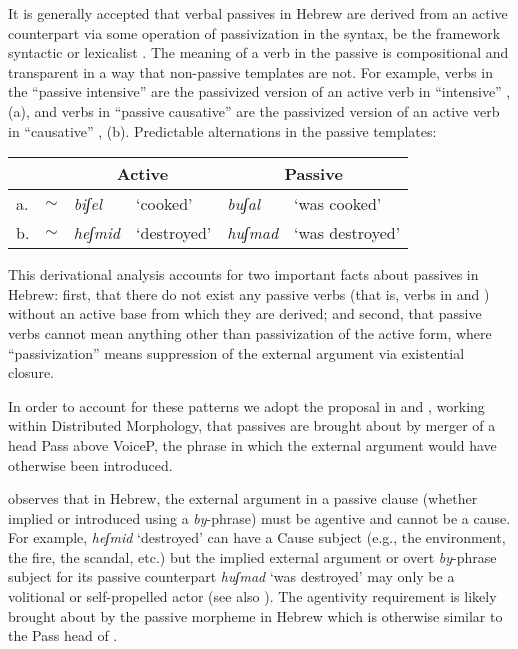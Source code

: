 It is generally accepted that verbal passives in Hebrew are derived from an active counterpart via some operation of passivization in the syntax, be the framework syntactic \citep{doron03,alexiadoudoron12,borer13oup} or lexicalist \citep{reinhartsiloni05,ussishkin05,laks11}. The meaning of a verb in the passive is compositional and transparent in a way that non-passive templates are not. For example, verbs in the ``passive intensive'' {\tpua} are the passivized version of an active verb in ``intensive'' {\tpie}, (\nextx a), and verbs in ``passive causative'' {\thuf} are the passivized version of an active verb in ``causative'' {\thif}, (\nextx b).
\ex Predictable alternations in the passive templates:\\
	\begin{tabular}{ll|ll|ll}
	& & \multicolumn{2}{c|}{Active} & \multicolumn{2}{c}{Passive} \\\hline
	a. & {\tpie} $\sim$ {\tpua} & \emph{biʃel} & `cooked' & \emph{buʃal} & `was cooked'\\
	b. & {\thif} $\sim$ {\thuf} & \emph{heʃmid} & `destroyed' & \emph{huʃmad} & `was destroyed'\\
	\end{tabular}
\xe
This derivational analysis accounts for two important facts about passives in Hebrew: first, that there do not exist any passive verbs (that is, verbs in {\tpua} and {\thuf}) without an active base from which they are derived; and second, that passive verbs cannot mean anything other than passivization of the active form, where ``passivization'' means suppression of the external argument via existential closure.

In order to account for these patterns we adopt the proposal in \cite{doron03} and \cite{alexiadoudoron12}, working within Distributed Morphology, that passives are brought about by merger of a head Pass above VoiceP, the phrase in which the external argument would have otherwise been introduced.


\cite{doron03} observes that in Hebrew, the external argument in a passive clause (whether implied or introduced using a \emph{by}-phrase) must be agentive and cannot be a cause. For example, \textit{heʃmid} `destroyed' can have a Cause subject (e.g., the environment, the fire, the scandal, etc.) but the implied external argument or overt \emph{by}-phrase subject for its passive counterpart \textit{huʃmad} `was destroyed' may only be a volitional or self-propelled actor (see also \citealt{folliharley08}). The agentivity requirement is likely brought about by the passive morpheme in Hebrew which is otherwise similar to the Pass head of \cite{bruening13}.

